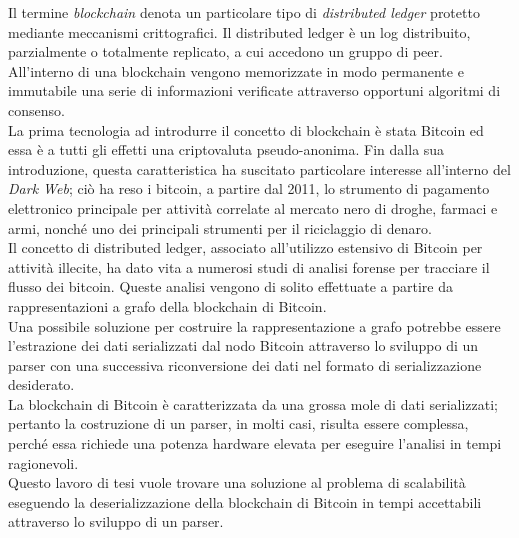 \documentclass[11pt, a4paper, titlepage]{toptesi}
\theoremstyle{definition}
\begin{document}
\sommario
Il termine \emph{blockchain} denota un particolare tipo di \emph{distributed ledger} protetto mediante meccanismi crittografici.
Il distributed ledger è un log distribuito, parzialmente o totalmente replicato, a cui accedono un gruppo di peer.
All’interno di una blockchain vengono memorizzate in modo permanente e immutabile una serie di informazioni verificate attraverso opportuni algoritmi di consenso.\\
La prima tecnologia ad introdurre il concetto di blockchain è stata Bitcoin ed essa è a tutti gli effetti una criptovaluta pseudo-anonima. Fin dalla sua introduzione, questa  caratteristica  ha suscitato particolare interesse all’interno del \emph{Dark Web}; ciò ha reso i bitcoin, a partire dal 2011, lo strumento di pagamento elettronico principale per attività correlate al mercato nero di droghe, farmaci e armi, nonché uno dei principali strumenti per il riciclaggio di denaro.\\
Il concetto di distributed ledger, associato all’utilizzo estensivo di Bitcoin per attività illecite, ha dato vita a numerosi studi di analisi forense per tracciare il flusso dei bitcoin. Queste analisi vengono di solito effettuate a partire da rappresentazioni a grafo della blockchain di Bitcoin.\\
Una possibile soluzione per costruire la rappresentazione a grafo potrebbe essere l'estrazione dei dati serializzati dal nodo Bitcoin attraverso lo sviluppo di un parser con una successiva riconversione dei dati nel formato di serializzazione desiderato.\\
La blockchain di Bitcoin è caratterizzata da una grossa mole di dati serializzati; pertanto la costruzione di un parser, in molti casi, risulta essere complessa, perché essa richiede una potenza hardware elevata per eseguire l'analisi in tempi ragionevoli.\\
Questo lavoro di tesi vuole trovare una soluzione al problema di scalabilità eseguendo la deserializzazione della blockchain di Bitcoin in tempi accettabili attraverso lo sviluppo di un parser.



\tableofcontents

\mainmatter
\end{document}
